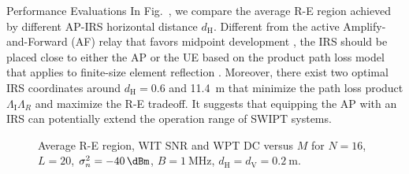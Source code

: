\documentclass[journal]{IEEEtran}
\begin{document}
\begin{section}{Performance Evaluations}
		In Fig.~, we compare the average R-E region achieved by different AP-IRS horizontal distance $d_{\mathrm{H}}$. Different from the active Amplify-and-Forward (AF) relay that favors midpoint development \cite{Li2017}, the IRS should be placed close to either the AP or the UE based on the product path loss model that applies to finite-size element reflection \cite{Ozdogan2020,Tang2021}. Moreover, there exist two optimal IRS coordinates around $d_{\mathrm{H}}=0.6$ and \SI{11.4}{\meter} that minimize the path loss product $\Lambda_{\mathrm{I}}\Lambda_R$ and maximize the R-E tradeoff. It suggests that equipping the AP with an IRS can potentially extend the operation range of SWIPT systems.

		\begin{figure}[!t]
			\centering
			\caption{Average R-E region, WIT SNR and WPT DC versus $M$ for $N=16$, $L=20$, $\sigma_n^2=\SI{-40}{\dBm}$, $B=\SI{1}{\MHz}$, $d_{\mathrm{H}}=d_{\mathrm{V}}=\SI{0.2}{\meter}$.}
		\end{figure}


\end{section}
\end{document}
